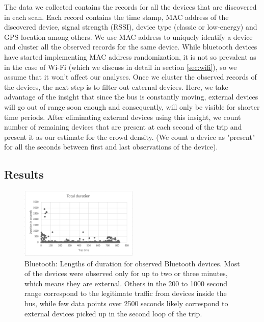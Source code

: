 The data we collected contains the records for all the devices that are discovered in each scan. Each record contains the time stamp, MAC address of the discovered device, signal strength (RSSI), device type (classic or low-energy) and GPS location among others. We use MAC address to uniquely identify a device and cluster all the observed records for the same device. While bluetooth devices have started implementing MAC address randomization, it is not so prevalent as in the case of Wi-Fi (which we discuss in detail in section \ref{sec:wifi}), so we assume that it won't affect our analyses. Once we cluster the observed records of the devices, the next step is to filter out external devices. Here, we take advantage of the insight that since the bus is constantly moving, external devices will go out of range soon enough and consequently, will only be visible for shorter time periods. After eliminating external devices using this insight, we count number of remaining devices that are present at each second of the trip and present it as our estimate for the crowd density. (We count a device as "present" for all the seconds between first and last observations of the device).

\subsection{Results}

\begin{figure}[!t]
\centering
\includegraphics[width=0.5\textwidth]{ble_device_durations.png}
\caption{Bluetooth: Lengths of duration for observed Bluetooth devices. Most of the devices were observed only for up to two or three minutes, which means they are external. Others in the 200 to 1000 second range correspond to the legitimate traffic from devices inside the bus, while few data points over 2500 seconds likely correspond to external devices picked up in the second loop of the trip.}
\label{fig:btdurations}
\end{figure}

